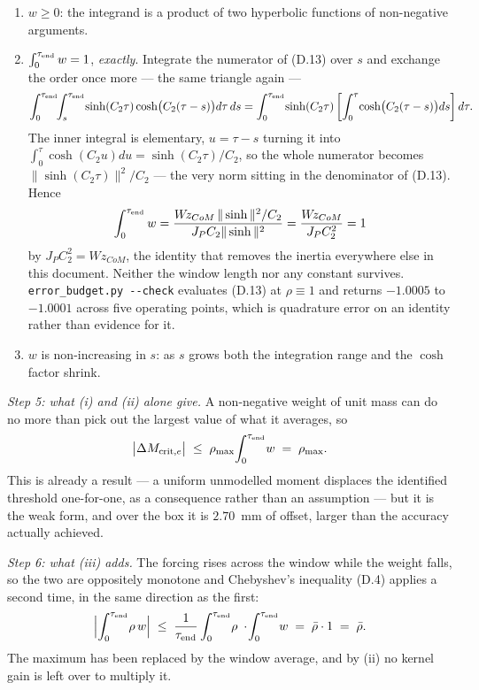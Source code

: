 \documentclass[11pt]{article}
\newcommand{\Wz}{W\!z_{CoM}}
\newcommand{\te}{\tau_{\rm end}}
\newcommand{\rmax}{\rho_{\max}}
\newcommand{\rbar}{\bar\rho}
\begin{document}
\begin{enumerate}
\item[(i)] $w\ge0$: the integrand is a product of two hyperbolic
  functions of non-negative arguments.
\item[(ii)] $\int_0^{\te} w = 1$, \emph{exactly}. Integrate the
  numerator of (D.13) over $s$ and exchange the order once more --- the
  same triangle again ---
  \[
    \int_0^{\te}\!\!\int_s^{\te}\!\sinh(C_2\tau)
      \cosh\bigl(C_2(\tau-s)\bigr)d\tau\,ds
    = \int_0^{\te}\!\sinh(C_2\tau)
      \left[\int_0^{\tau}\!\cosh\bigl(C_2(\tau-s)\bigr)ds\right]d\tau .
  \]
  The inner integral is elementary, $u = \tau-s$ turning it into
  $\int_0^{\tau}\cosh(C_2u)du = \sinh(C_2\tau)/C_2$, so the whole
  numerator becomes $\|\sinh(C_2\tau)\|^2/C_2$ --- the very norm sitting
  in the denominator of (D.13). Hence
  \[
    \int_0^{\te} w
    = \frac{\Wz\,\|\sinh\|^2/C_2}{J_PC_2\|\sinh\|^2}
    = \frac{\Wz}{J_PC_2^{2}} = 1
  \]
  by $J_PC_2^{2} = \Wz$, the identity that removes the inertia
  everywhere else in this document. Neither the window length nor any
  constant survives. \texttt{error\_budget.py -{}-check} evaluates
  (D.13) at $\rho\equiv1$ and returns $-1.0005$ to $-1.0001$ across five
  operating points, which is quadrature error on an identity rather than
  evidence for it.
\item[(iii)] $w$ is non-increasing in $s$: as $s$ grows both the
  integration range and the $\cosh$ factor shrink.
\end{enumerate}

\emph{Step 5: what (i) and (ii) alone give.} A non-negative weight of
unit mass can do no more than pick out the largest value of what it
averages, so
\[
  \bigl|\Delta M_{{\rm crit},e}\bigr|
  \;\le\; \rmax\!\int_0^{\te}\! w \;=\; \rmax .
\]
This is already a result --- a uniform unmodelled moment displaces the
identified threshold one-for-one, as a consequence rather than an
assumption --- but it is the weak form, and over the box it is
$2.70$~mm of offset, larger than the accuracy actually achieved.

\emph{Step 6: what (iii) adds.} The forcing rises across the window
while the weight falls, so the two are oppositely monotone and
Chebyshev's inequality (D.4) applies a second time, in the same
direction as the first:
\[
  \Bigl|\int_0^{\te}\!\rho\,w\Bigr|
  \;\le\; \frac{1}{\te}\int_0^{\te}\!\rho \;\cdot\!\int_0^{\te}\! w
  \;=\; \rbar\cdot1 \;=\; \rbar .
\]
The maximum has been replaced by the window average, and by (ii) no
kernel gain is left over to multiply it.
\end{document}
